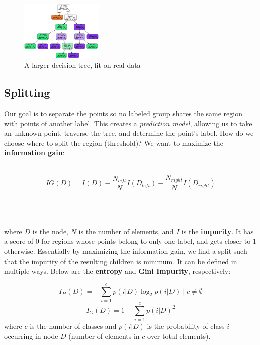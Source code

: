 \documentclass{article}
\begin{document}
\begin{figure}
  \begin{center}
    \vspace{-60pt}
    \includegraphics[width=0.35\textwidth]{DecisionTree.png}
    \vspace{-35pt}
  \end{center}
  \caption{A larger decision tree, fit on real data}
  \vspace{-35pt}
\end{figure}

\subsection{Splitting}
Our goal is to separate the points so no labeled group shares the same region with points of another label. This creates a \textit{prediction model}, allowing us to take an unknown point, traverse the tree, and determine the point's label. How do we choose where to split the region (threshold)? We want to maximize the \textbf{information gain}:
\\
\\
\begin{left}
\hspace{40pt}
$$ IG(D) = I(D) - \frac{N_{left}}{N}I(D_{left}) - \frac{N_{right}}{N}I(D_{right}) $$
\end{left}
\\
\\
\\
where $D$ is the node, $N$ is the number of elements, and $I$ is the \textbf{impurity}. It has a score of 0 for regions whose points belong to only one label, and gets closer to 1 otherwise. Essentially by maximizing the information gain, we find a split such that the impurity of the resulting children is minimum. It can be defined in multiple ways. Below are the \textbf{entropy} and \textbf{Gini Impurity}, respectively:

$$ I_H(D) = - \sum_{i=1}^{c} p(i|D)\log_2p(i|D) \mid c \neq \emptyset $$
$$ I_G(D) = 1 - \sum_{i=1}^{c} p(i|D)^2 $$ 
\noindent
where $c$ is the number of classes and $p(i|D)$ is the probability of class $i$ occurring in node $D$ (number of elements in $c$ over total elements).
\end{document}
